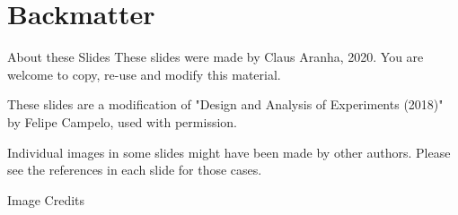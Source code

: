 \section{Backmatter}
\begin{frame}{About these Slides}
  These slides were made by Claus Aranha, 2020. You are welcome to copy, re-use and modify this material.
  \bigskip

  These slides are a modification of "Design and Analysis of Experiments (2018)" by Felipe Campelo, used with permission.
  \bigskip

  Individual images in some slides might have been made by other
  authors. Please see the references in each slide for those cases.
\end{frame}

\begin{frame}[allowframebreaks]{Image Credits}
  \printnotes
\end{frame}
